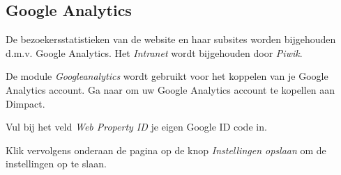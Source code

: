 \subsection{Google Analytics}\label{googleanalytics}
De bezoekersstatistieken van de \drupalpath website en haar subsites worden bijgehouden d.m.v. Google Analytics. Het \emph{Intranet} wordt bijgehouden door \emph{Piwik}.

De module \emph{Googleanalytics}  wordt gebruikt voor het koppelen van je Google Analytics account. Ga naar  om uw Google Analytics account te kopellen aan Dimpact. 

Vul bij het veld \emph{Web Property ID} je eigen Google ID code in. 

Klik vervolgens onderaan de pagina op de knop \emph{Instellingen opslaan} om de instellingen op te slaan.